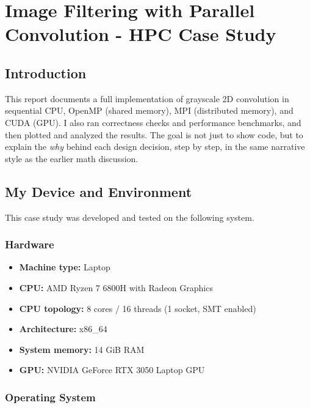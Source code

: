 \documentclass[
]{article}
\author{}
\date{}
\providecommand{\tightlist}{%
  \setlength{\itemsep}{0pt}\setlength{\parskip}{0pt}}
\begin{document}
\section{Image Filtering with Parallel Convolution - HPC Case
Study}\label{image-filtering-with-parallel-convolution---hpc-case-study}

\subsection{Introduction}\label{introduction}

This report documents a full implementation of grayscale 2D convolution
in sequential CPU, OpenMP (shared memory), MPI (distributed memory), and
CUDA (GPU). I also ran correctness checks and performance benchmarks,
and then plotted and analyzed the results. The goal is not just to show
code, but to explain the \emph{why} behind each design decision, step by
step, in the same narrative style as the earlier math discussion.

\subsection{My Device and Environment}\label{my-device-and-environment}

This case study was developed and tested on the following system.

\subsubsection{Hardware}\label{hardware}

\begin{itemize}
\tightlist
\item
  \textbf{Machine type:} Laptop
\item
  \textbf{CPU:} AMD Ryzen 7 6800H with Radeon Graphics
\item
  \textbf{CPU topology:} 8 cores / 16 threads (1 socket, SMT enabled)
\item
  \textbf{Architecture:} x86\_64
\item
  \textbf{System memory:} 14 GiB RAM
\item
  \textbf{GPU:} NVIDIA GeForce RTX 3050 Laptop GPU
\end{itemize}

\subsubsection{Operating System}\label{operating-system}
\end{document}
